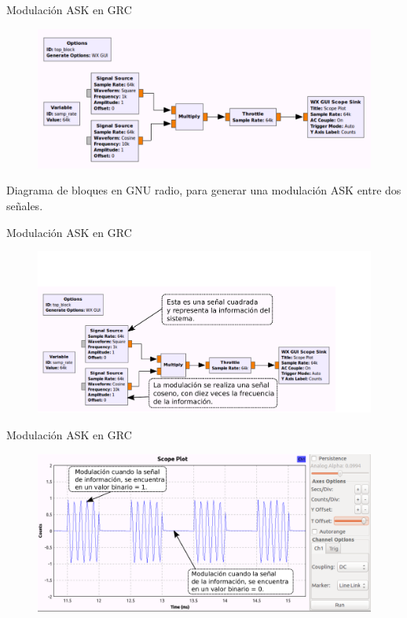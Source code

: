 \begin{frame}{Modulación ASK en GRC}

\begin{figure}[H]
\centering
\includegraphics[width=\textwidth]{parte1/lab4/pdf/lab4_1.pdf}
\end{figure}
Diagrama de bloques en GNU radio, para generar una modulación ASK entre dos señales.
\end{frame}

\begin{frame}{Modulación ASK en GRC}
\vspace{-1cm}
\begin{figure}[H]
\centering
\includegraphics[width=1.1\textwidth]{parte1/lab4/pdf/lab4_2.pdf}
\end{figure}
\end{frame}

\begin{frame}{Modulación ASK en GRC}
\vspace{-1.5cm}
\begin{figure}[H]
\centering
\includegraphics[width=1.1\textwidth]{parte1/lab4/pdf/lab4_3.pdf}
\end{figure}
\end{frame}

